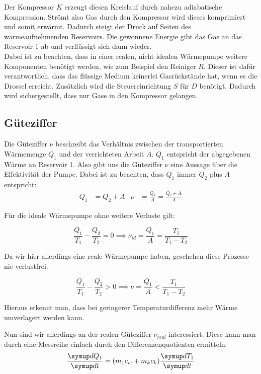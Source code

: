 Der Kompressor $K$ erzeugt diesen Kreislauf durch nahezu adiabatische Kompression. Strömt also Gas durch den 
Kompressor wird dieses komprimiert und somit erwärmt.
Dadurch steigt der Druck auf Seiten des wärmeaufnehmenden Reservoirs.
Die gewonnene Energie gibt das Gas an das Reservoir 1 ab und verflüssigt sich dann wieder.\\

Dabei ist zu beachten, dass in einer realen, nicht idealen Wärmepumpe weitere Komponenten benötigt werden, wie zum Beispiel den Reiniger $R$.
Dieser ist dafür verantwortlich, dass das flüssige Medium keinerlei Gasrückstände hat, wenn es die Drossel erreicht.
Zusätzlich wird die Steuereinrichtung $S$ für $D$ benötigt. Dadurch wird sichergestellt, dass nur Gase in den Kompressor gelangen.

\subsection{Güteziffer} \label{sec:Güteziffer}

Die Güteziffer $\nu$ beschreibt das Verhältnis zwischen der transportierten Wärmemenge $Q_{1}$ und der verrichteten Arbeit $A$.
$Q_{1}$ entspricht der abgegebenen Wärme an Reservoir 1. Also gibt uns die Güteziffer $\nu$ eine Aussage über die Effektivität der Pumpe.
Dabei ist zu beachten, dass $Q_{1}$ immer $Q_{2}$ plus $A$ entspricht:
\begin{align} \label{eq:Güteziffer}
    Q_{1} &= Q_{2} + A & \nu &= \frac{Q_{1}}{A} = \frac{Q_{2} + A}{A}
\end{align}

Für die ideale Wärmepumpe ohne weitere Verluste gilt:

\begin{equation} \label{eq:nu_id}
    \frac{Q_{1}}{T_{1}} - \frac{Q_{2}}{T_{2}} = 0 \implies \nu_{id} = \frac{Q_{1}}{A} = \frac{T_{1}}{T_{1} - T_{2}}
\end{equation}

Da wir hier allerdings eine reale Wärmepumpe haben, geschehen diese Prozesse nie verlustfrei:

\begin{equation}
    \frac{Q_{1}}{T_{1}} - \frac{Q_{2}}{T_{2}} > 0 \implies \nu = \frac{Q_{1}}{A} < \frac{T_{1}}{T_{1} - T_{2}}
\end{equation}

Hieraus erkennt man, dass bei geringerer Temperaturdifferenz mehr Wärme umverlagert werden kann.

Nun sind wir allerdings an der realen Güteziffer $\nu_{real}$ interessiert.
Diese kann man durch eine Messreihe einfach durch den Differenzenquotienten ermitteln:
\begin{equation} \label{eq:Q1diff}
    \frac{\dif{Q_{1}}}{\dif t} = (m_{1} c_{w} + m_{k} c_{k}) \frac{\dif{T_{1}}}{\dif{t}}
\end{equation}

